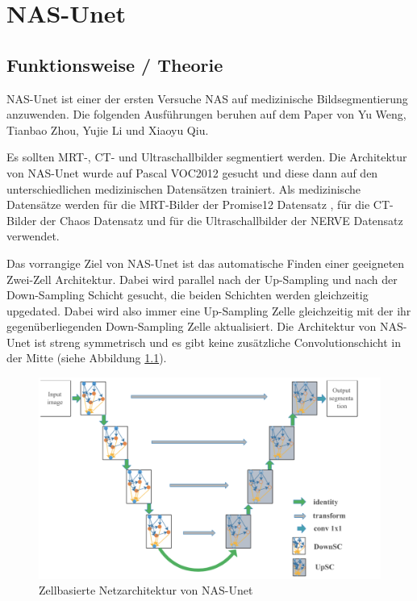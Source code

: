\chapter{NAS-Unet}
\label{ch:nasunet}




\section{Funktionsweise / Theorie}


NAS-Unet ist einer der ersten Versuche NAS auf medizinische Bildsegmentierung anzuwenden. Die folgenden Ausführungen beruhen auf dem Paper \cite{nasunetPaper} von Yu Weng, Tianbao Zhou, Yujie Li und Xiaoyu Qiu.

Es sollten MRT-, CT- und Ultraschallbilder segmentiert werden. Die Architektur von NAS-Unet wurde auf Pascal VOC2012 \cite{PascalVOCDatensatz} gesucht und diese dann auf den unterschiedlichen medizinischen Datensätzen trainiert. Als medizinische Datensätze werden für die MRT-Bilder der Promise12 Datensatz \cite{Promise12Datensatz}, für die CT-Bilder der Chaos Datensatz \cite{ChaosDatensatz} und für die Ultraschallbilder der NERVE Datensatz \cite{NerveDatensatz} verwendet. 

Das vorrangige Ziel von NAS-Unet ist das automatische Finden einer geeigneten Zwei-Zell Architektur. Dabei wird parallel nach der Up-Sampling und nach der Down-Sampling Schicht gesucht, die beiden Schichten werden gleichzeitig upgedated. Dabei wird also immer eine Up-Sampling Zelle gleichzeitig mit der ihr gegenüberliegenden Down-Sampling Zelle aktualisiert. Die Architektur von NAS-Unet ist streng symmetrisch und es gibt keine zusätzliche Convolutionschicht in der Mitte (siehe Abbildung \ref{pic:nasUnet_ArchitekturGesamt}). 

\begin{figure}[H]
	
	\centering
	\includegraphics[scale=0.5]{Pictures/nasUnet/Bild1.png}
	\caption{Zellbasierte Netzarchitektur von NAS-Unet \cite{nasunetPaper} }
	\label{pic:nasUnet_ArchitekturGesamt}
\end{figure}

